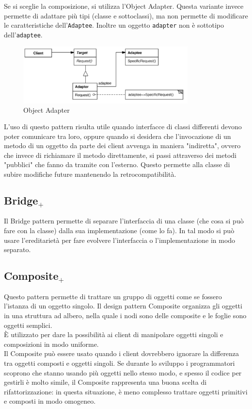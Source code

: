 Se si sceglie la composizione, si utilizza l'Object Adapter. Questa variante invece permette di adattare più tipi (classe e sottoclassi), ma non permette di modificare le caratteristiche dell'\texttt{Adaptee}. Inoltre un oggetto \texttt{adapter} non è sottotipo dell'\texttt{adaptee}.

\begin{figure}[H]
\includegraphics[width=0.8\textwidth]{res/img/DP/objectAdapter}
\caption{Object Adapter}
\end{figure}

L'uso di questo pattern risulta utile quando interfacce di classi differenti devono poter comunicare tra loro, oppure quando si desidera che l'invocazione di un metodo di un oggetto da parte dei client avvenga in maniera "indiretta", ovvero che invece di richiamare il metodo direttamente, si passi attraverso dei metodi "pubblici" che fanno da tramite con l'esterno. 
Questo permette alla classe di subire modifiche future mantenendo la retrocompatibilità.

\subsection{Bridge$_+$}
Il Bridge pattern permette di separare l'interfaccia di una classe (che cosa si può fare con la classe) dalla sua implementazione (come lo fa). 
In tal modo si può usare l'ereditarietà per fare evolvere l'interfaccia o l'implementazione in modo separato.

\subsection{Composite$_+$}
Questo pattern permette di trattare un gruppo di oggetti come se fossero l'istanza di un oggetto singolo. 
Il design pattern Composite organizza gli oggetti in una struttura ad albero, nella quale i nodi sono delle composite e le foglie sono oggetti semplici.\\

È utilizzato per dare la possibilità ai client di manipolare oggetti singoli e composizioni in modo uniforme. \\
Il Composite può essere usato quando i client dovrebbero ignorare la differenza tra oggetti composti e oggetti singoli. 
Se durante lo sviluppo i programmatori scoprono che stanno usando più oggetti nello stesso modo, e spesso il codice per gestirli è molto simile, il Composite rappresenta una buona scelta di rifattorizzazione: in questa situazione, è meno complesso trattare oggetti primitivi e composti in modo omogeneo.

